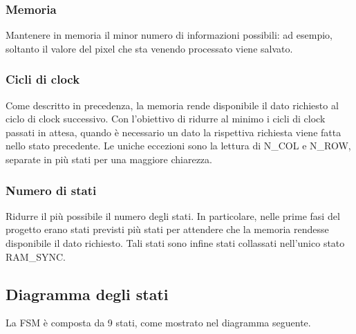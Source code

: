 \documentclass[a4paper, 12pt]{article}
\begin{document}
\subsubsection{Memoria}
Mantenere in memoria il minor numero di informazioni possibili: ad esempio, soltanto il valore del pixel che sta venendo processato viene salvato.

\subsubsection{Cicli di clock}
Come descritto in precedenza, la memoria rende disponibile il dato richiesto al ciclo di clock successivo. Con l'obiettivo di ridurre al minimo i cicli di clock passati in attesa, quando è necessario un dato la rispettiva richiesta viene fatta nello stato precedente. Le uniche eccezioni sono la lettura di N\_COL e N\_ROW, separate in più stati per una maggiore chiarezza.

\subsubsection{Numero di stati}
Ridurre il più possibile il numero degli stati. In particolare, nelle prime fasi del progetto erano stati previsti più stati per attendere che la memoria rendesse disponibile il dato richiesto. Tali stati sono infine stati collassati nell'unico stato RAM\_SYNC.


\pagebreak
\subsection{Diagramma degli stati}
La FSM è composta da 9 stati, come mostrato nel diagramma seguente.
\end{document}
